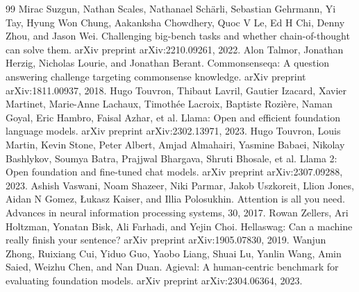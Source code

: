 \documentclass[a4paper,11pt]{article}
\begin{document}
\begin{thebibliography}{99}
 Mirac Suzgun, Nathan Scales, Nathanael Schärli, Sebastian Gehrmann, Yi Tay, Hyung Won Chung, Aakanksha Chowdhery, Quoc V Le, Ed H Chi, Denny Zhou, and Jason Wei. Challenging big-bench tasks and whether chain-of-thought can solve them. arXiv preprint arXiv:2210.09261, 2022.
 Alon Talmor, Jonathan Herzig, Nicholas Lourie, and Jonathan Berant. Commonsenseqa: A question answering challenge targeting commonsense knowledge. arXiv preprint arXiv:1811.00937, 2018.
 Hugo Touvron, Thibaut Lavril, Gautier Izacard, Xavier Martinet, Marie-Anne Lachaux, Timothée Lacroix, Baptiste Rozière, Naman Goyal, Eric Hambro, Faisal Azhar, et al. Llama: Open and efficient foundation language models. arXiv preprint arXiv:2302.13971, 2023.
 Hugo Touvron, Louis Martin, Kevin Stone, Peter Albert, Amjad Almahairi, Yasmine Babaei, Nikolay Bashlykov, Soumya Batra, Prajjwal Bhargava, Shruti Bhosale, et al. Llama 2: Open foundation and fine-tuned chat models. arXiv preprint arXiv:2307.09288, 2023.
 Ashish Vaswani, Noam Shazeer, Niki Parmar, Jakob Uszkoreit, Llion Jones, Aidan N Gomez, Łukasz Kaiser, and Illia Polosukhin. Attention is all you need. Advances in neural information processing systems, 30, 2017.
 Rowan Zellers, Ari Holtzman, Yonatan Bisk, Ali Farhadi, and Yejin Choi. Hellaswag: Can a machine really finish your sentence? arXiv preprint arXiv:1905.07830, 2019.
 Wanjun Zhong, Ruixiang Cui, Yiduo Guo, Yaobo Liang, Shuai Lu, Yanlin Wang, Amin Saied, Weizhu Chen, and Nan Duan. Agieval: A human-centric benchmark for evaluating foundation models. arXiv preprint arXiv:2304.06364, 2023.
\end{thebibliography}
\end{document}
